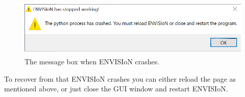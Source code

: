 \begin{figure}[H]
    \centering
    \includegraphics[scale = 0.55]{Images/Envisioncrashed.png}
    \caption{The message box when ENVISIoN crashes.}
    \label{fig:GUIcrash}
\end{figure}

To recover from that ENVISIoN crashes you can either reload the page as mentioned above, or just close the GUI window and restart ENVISIoN.
